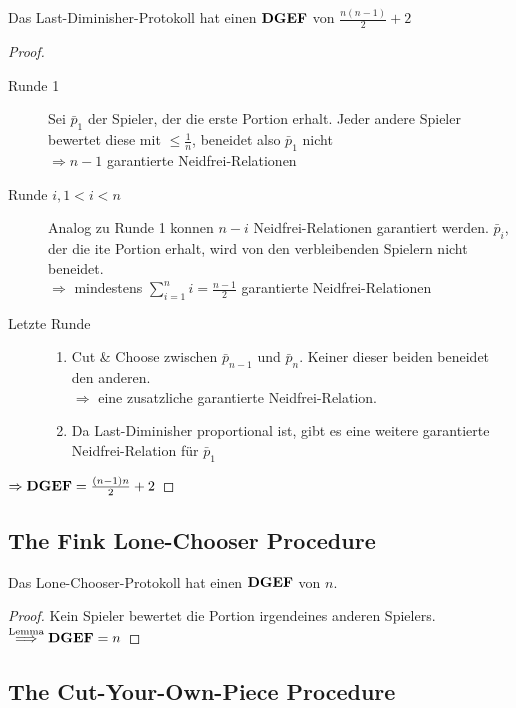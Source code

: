 \begin{satz}
 Das Last-Diminisher-Protokoll hat einen $\text{\textbf{DGEF}}$ von $\frac{n(n-1)}{2}+2$
\end{satz}
\begin{proof}
 \begin{description}
  \item[Runde 1] Sei $\bar{p}_1$ der Spieler, der die erste Portion erhalt. Jeder andere Spieler bewertet diese mit $\leq\frac{1}{n}$,
                 beneidet also $\bar{p}_1$ nicht\\$\Rightarrow n-1$ garantierte Neidfrei-Relationen
  \item[Runde $i, 1<i<n$] Analog zu Runde 1 konnen $n-i$ Neidfrei-Relationen garantiert werden. $\bar{p}_i$, der die ite Portion erhalt, wird
                          von den verbleibenden Spielern nicht beneidet.\\$\Rightarrow$ mindestens $\sum\limits_{i=1}^ni=\frac{n-1}{2}$
                          garantierte Neidfrei-Relationen
  \item[Letzte Runde] \begin{enumerate}
                       \item Cut \& Choose zwischen $\bar{p}_{n-1}$ und $\bar{p}_n$. Keiner dieser beiden beneidet den anderen.\\
                             $\Rightarrow$ eine zusatzliche garantierte Neidfrei-Relation.
                       \item Da Last-Diminisher proportional ist, gibt es eine weitere garantierte Neidfrei-Relation für $\bar{p}_1$
                      \end{enumerate}
 \end{description}
$\Rightarrow\text{\textbf{DGEF}}=\frac{(n-1)n}{2}+2$ 
\end{proof}
\newpage
\subsection{The Fink Lone-Chooser Procedure}
\begin{satz}
 Das Lone-Chooser-Protokoll hat einen $\text{\textbf{DGEF}}$ von $n$.
\end{satz}
\begin{proof}
 Kein Spieler bewertet die Portion irgendeines anderen Spielers.\\$\stackrel{\text{Lemma}}{\Longrightarrow}\text{\textbf{DGEF}}=n$
\end{proof}
\newpage
\subsection{The Cut-Your-Own-Piece Procedure}
\newpage

